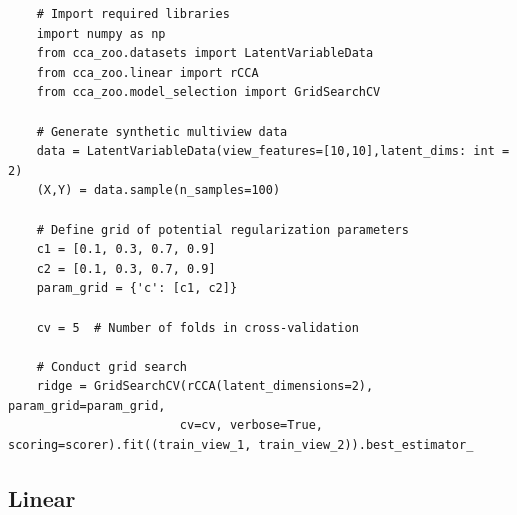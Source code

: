 \begin{verbatim}
    # Import required libraries
    import numpy as np
    from cca_zoo.datasets import LatentVariableData
    from cca_zoo.linear import rCCA
    from cca_zoo.model_selection import GridSearchCV
    
    # Generate synthetic multiview data
    data = LatentVariableData(view_features=[10,10],latent_dims: int = 2)
    (X,Y) = data.sample(n_samples=100)

    # Define grid of potential regularization parameters
    c1 = [0.1, 0.3, 0.7, 0.9]
    c2 = [0.1, 0.3, 0.7, 0.9]
    param_grid = {'c': [c1, c2]}

    cv = 5  # Number of folds in cross-validation

    # Conduct grid search
    ridge = GridSearchCV(rCCA(latent_dimensions=2), param_grid=param_grid,
                        cv=cv, verbose=True, scoring=scorer).fit((train_view_1, train_view_2)).best_estimator_
    \end{verbatim}

\subsection{Linear}

